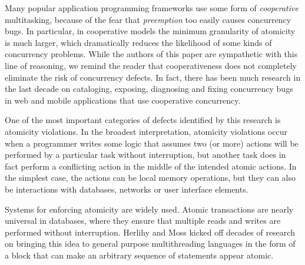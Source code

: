 \documentclass[acmsmall,anonymous,review]{acmart}\settopmatter{printfolios=true,printccs=false,printacmref=false}
\begin{document}

Many popular application programming frameworks use some form of \emph{cooperative} multitasking, because of the fear that \emph{preemption} too easily causes concurrency bugs.
In particular, in cooperative models the minimum granularity of atomicity is much larger, which dramatically reduces the likelihood of some kinds of concurrency problems.
While the authors of this paper are sympathetic with this line of reasoning, we remind the reader that cooperativeness does not completely eliminate the risk of concurrency defects\footnotemark{}.
In fact, there has been much research in the last decade on cataloging, exposing, diagnosing and fixing concurrency bugs in web and mobile applications that use cooperative concurrency.


One of the most important categories of defects identified by this research is atomicity violations.
In the broadest interpretation, atomicity violations occur when a programmer writes some logic that assumes two (or more) actions will be performed by a particular task without interruption, but another task does in fact perform a conflicting action in the middle of the intended atomic actions.
In the simplest case, the actions can be local memory operations, but they can also be interactions with databases, networks or user interface elements.

Systems for enforcing atomicity are widely used.
Atomic transactions are nearly universal in databases, where they ensure that multiple reads and writes are performed without interruption.
Herlihy and Moss \cite{Herlihy1993} kicked off decades of research on bringing this idea to general purpose multithreading languages in the form of a block that can make an arbitrary sequence of statements appear atomic.

\end{document}
